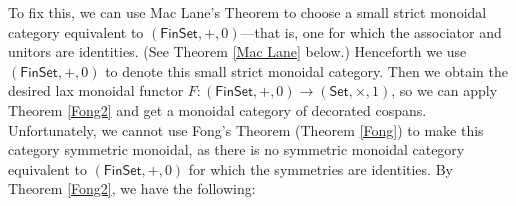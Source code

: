 \documentclass[oneside,final]{ucr}
\theoremstyle{definition}
\begin{document}
{To fix this, we can use Mac Lane's Theorem to choose a small strict monoidal category equivalent to $(\mathsf{FinSet},+,0)$---that is, one for which the associator and unitors are identities. (See Theorem \ref{Mac Lane} below.)   Henceforth we use $(\mathsf{FinSet},+,0)$ to denote this small strict monoidal category.
Then we obtain the desired lax monoidal functor $F \colon (\mathsf{FinSet},+,0) \to (\mathsf{Set},\times,1)$, so we can apply Theorem \ref{Fong2} and get a monoidal category of decorated cospans. 
Unfortunately, we cannot use Fong's Theorem (Theorem \ref{Fong}) to make this category symmetric monoidal, as there is no symmetric monoidal category equivalent to $(\mathsf{FinSet},+,0)$ for which the symmetries are identities. By Theorem \ref{Fong2}, we have the following:

}
\end{document}
